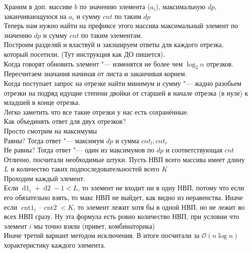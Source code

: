 \documentclass[14pt,a4paper,report]{ncc}
\begin{document}
Храним в доп. массиве $b$ по значению элемента ($a_i$), максимальную $dp$, заканчивающуюся на $a_i$ и сумму $cnt$ по таким $dp$\\
Теперь нам нужно найти на префиксе этого массива максимальный элемент по значению $dp$ и сумму $cnt$ по таким элементам.\\

Построим разделяй и властвуй и закэшируем ответы для каждого отрезка, который посетили. (Тут инструкция как ДО пишется).\\
Когда говорят обновить элемент "--- изменятся не более чем $\log_2{n}$ отрезков. Пересчитаем значания начиная от листа и заканчивая корнем.\\
Когда поступает запрос на отрезке найти минимум и сумму "--- жадно разобьем отрезки на подряд идущие степени двойки от старшей в начале отрезка (в нуле) к младшей в конце отрезка.\\
Легко заметить что все такие отрезки у нас есть сохранённые.\\

Как объединять ответ для двух отрезков?\\
Просто смотрим на максимумы\\
Равны? Тогда ответ "--- максимум $dp$ и сумма $cnt_l, cnt_r$\\
Не равны? Тогда ответ "--- один из максимумов по $dp$ и соответствующая $cnt$\\

Отлично, посчитали необходимые штуки. Пусть НВП всего массива имеет длину $L$ и количество таких подпоследовательностей всего $K$\\
Проходим каждый элемент.\\
Если $\operatorname{d1}_i + \operatorname{d2} - 1 < L$, то элемент не входит ни в одну НВП, потому что если его обязательно взять, то макс НВП не выйдет, как видно из неравенства.
Иначе если $\operatorname{cnt1}_i \cdot \operatorname{cnt2} < K$, то элемент лежит хотя бы в одной НВП, но не лежит во всех НВП сразу. Ну эта формула есть ровно количество НВП, при условии что элемент $i$ мы точно взяли (привет, комбинаторика)\\
Иначе третий вариант методом исключения.
В итоге посчитали за $\mathcal{O}(n\log{n})$ хорактеристику каждого элемента.
\end{document}
